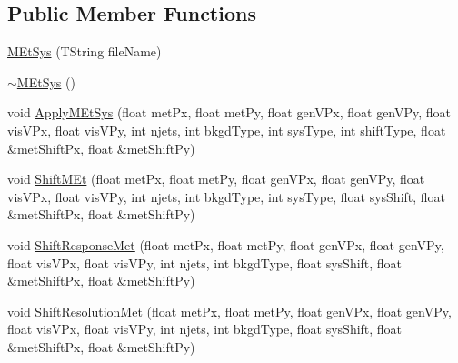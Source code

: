 \subsection*{Public Member Functions}
\begin{DoxyCompactItemize}
\item 
\hyperlink{classMEtSys_a275f454299d9a8de1a88fb25e6ce7295}{MEtSys} (TString fileName)
\item 
\hyperlink{classMEtSys_a1a0d2275df8de195a44d8d19bf593b48}{$\sim$MEtSys} ()
\item 
void \hyperlink{classMEtSys_a845ef3f7f0420219c79c81dea8a326b8}{ApplyMEtSys} (float metPx, float metPy, float genVPx, float genVPy, float visVPx, float visVPy, int njets, int bkgdType, int sysType, int shiftType, float \&metShiftPx, float \&metShiftPy)
\item 
void \hyperlink{classMEtSys_a6363f250899177442b8662bbe266699a}{ShiftMEt} (float metPx, float metPy, float genVPx, float genVPy, float visVPx, float visVPy, int njets, int bkgdType, int sysType, float sysShift, float \&metShiftPx, float \&metShiftPy)
\item 
void \hyperlink{classMEtSys_ac0f73d0c4b0f762f3326e389e30380b7}{ShiftResponseMet} (float metPx, float metPy, float genVPx, float genVPy, float visVPx, float visVPy, int njets, int bkgdType, float sysShift, float \&metShiftPx, float \&metShiftPy)
\item 
void \hyperlink{classMEtSys_a97e00588ed003eeb90730ff2ac4be9f8}{ShiftResolutionMet} (float metPx, float metPy, float genVPx, float genVPy, float visVPx, float visVPy, int njets, int bkgdType, float sysShift, float \&metShiftPx, float \&metShiftPy)
\end{DoxyCompactItemize}



